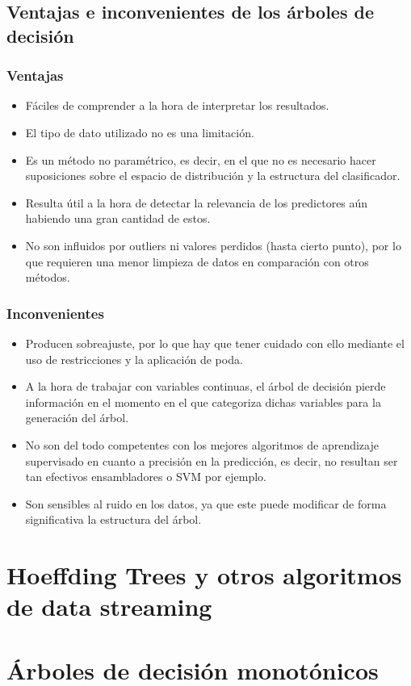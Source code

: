 \subsection{Ventajas e inconvenientes de los árboles de decisión}

\subsubsection{Ventajas}

\begin{itemize}
	\item Fáciles de comprender a la hora de interpretar los resultados.
	\item El tipo de dato utilizado no es una limitación.
	\item Es un método no paramétrico, es decir, en el que no es necesario hacer suposiciones sobre el espacio de distribución y la estructura del clasificador.
	\item Resulta útil a la hora de detectar la relevancia de los predictores aún habiendo una gran cantidad de estos.
	\item No son influidos por outliers ni valores perdidos (hasta cierto punto), por lo que requieren una menor limpieza de datos en comparación con otros métodos.
\end{itemize}

\subsubsection{Inconvenientes}

\begin{itemize}
	\item Producen sobreajuste, por lo que hay que tener cuidado con ello mediante el uso de restricciones y la aplicación de poda.
	\item A la hora de trabajar con variables continuas, el árbol de decisión pierde información en el momento en el que categoriza dichas variables para la generación del árbol.
	\item No son del todo competentes con los mejores algoritmos de aprendizaje supervisado en cuanto a precisión en la predicción, es decir, no resultan ser tan efectivos ensambladores o SVM por ejemplo.
	\item Son sensibles al ruido en los datos, ya que este puede modificar de forma significativa la estructura del árbol.
\end{itemize}


\section{Hoeffding Trees y otros algoritmos de data streaming}

\section{Árboles de decisión monotónicos}


\newpage


